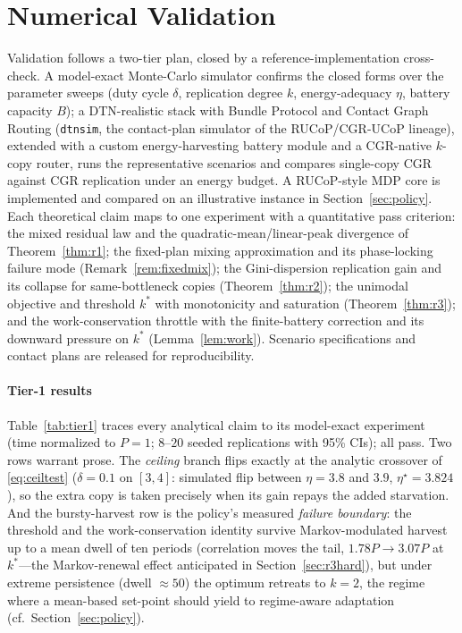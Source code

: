 \documentclass[twocolumn,3p,times,procedia]{elsarticle}
\newcommand{\kstar}{k^{\ast}}
\begin{document}
\section{Numerical Validation}\label{sec:sim}
Validation follows a two-tier plan, closed by a reference-implementation
cross-check. A model-exact Monte-Carlo simulator
confirms the closed forms over the parameter sweeps (duty cycle $\delta$,
replication degree $k$, energy-adequacy $\eta$, battery capacity $B$); a
DTN-realistic stack with Bundle Protocol and Contact Graph Routing
(\texttt{dtnsim}, the contact-plan simulator of the RUCoP/CGR-UCoP
lineage), extended with a custom energy-harvesting battery module and a
CGR-native $k$-copy router, runs the representative scenarios and compares
single-copy CGR against CGR replication under an energy budget. A RUCoP-style MDP core is implemented and compared on an illustrative
instance in Section~\ref{sec:policy}.
Each theoretical claim maps to one experiment with a quantitative pass
criterion: the mixed residual law and the quadratic-mean/linear-peak
divergence of Theorem~\ref{thm:r1}; the fixed-plan mixing approximation and its phase-locking failure
mode (Remark~\ref{rem:fixedmix}); the Gini-dispersion replication
gain and its collapse for same-bottleneck copies (Theorem~\ref{thm:r2});
the unimodal objective and threshold $\kstar$ with monotonicity and
saturation (Theorem~\ref{thm:r3}); and the work-conservation throttle
with the finite-battery correction and its downward pressure on $\kstar$
(Lemma~\ref{lem:work}). Scenario specifications and contact plans are
released for reproducibility.

\paragraph*{Tier-1 results}
Table~\ref{tab:tier1} traces every analytical claim to its model-exact
experiment (time normalized to $P{=}1$; $8$--$20$ seeded replications
with 95\% CIs); all pass. Two rows warrant prose. The \emph{ceiling}
branch flips exactly at the analytic crossover of \eqref{eq:ceiltest}
($\delta{=}0.1$ on $[3,4]$: simulated flip between $\eta{=}3.8$ and
$3.9$, $\eta^\star{=}3.824$), so the extra copy is taken precisely when
its gain repays the added starvation. And the bursty-harvest row is the
policy's measured \emph{failure boundary}: the threshold and the
work-conservation identity survive Markov-modulated harvest up to a
mean dwell of ten periods (correlation moves the tail, $1.78P\to3.07P$
at $\kstar$---the Markov-renewal effect anticipated in
Section~\ref{sec:r3hard}), but under extreme persistence (dwell
${\approx}50$) the optimum retreats to $k{=}2$, the regime where a
mean-based set-point should yield to regime-aware adaptation
(cf.\ Section~\ref{sec:policy}).
\end{document}
